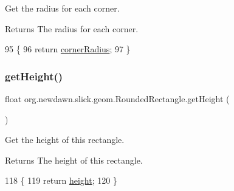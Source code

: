 Get the radius for each corner.

\begin{DoxyReturn}{Returns}
The radius for each corner. 
\end{DoxyReturn}

\begin{DoxyCode}
95                                    \{
96         \textcolor{keywordflow}{return} \mbox{\hyperlink{classorg_1_1newdawn_1_1slick_1_1geom_1_1_rounded_rectangle_a3326619644f3ba7e5493f8b191011aa1}{cornerRadius}};
97     \}
\end{DoxyCode}
\mbox{\label{classorg_1_1newdawn_1_1slick_1_1geom_1_1_rounded_rectangle_a95f4c34fc0fccbed758f172a326df4da}} 
\subsubsection{\texorpdfstring{get\+Height()}{getHeight()}}
{\footnotesize\ttfamily float org.\+newdawn.\+slick.\+geom.\+Rounded\+Rectangle.\+get\+Height (\begin{DoxyParamCaption}{ }\end{DoxyParamCaption})\hspace{0.3cm}{\ttfamily [inline]}}

Get the height of this rectangle.

\begin{DoxyReturn}{Returns}
The height of this rectangle. 
\end{DoxyReturn}

\begin{DoxyCode}
118                              \{
119         \textcolor{keywordflow}{return} \mbox{\hyperlink{classorg_1_1newdawn_1_1slick_1_1geom_1_1_rectangle_a3bd010fdce636fc11ed0e0ad4d4b4a0a}{height}};
120     \}
\end{DoxyCode}
\mbox{\label{classorg_1_1newdawn_1_1slick_1_1geom_1_1_rounded_rectangle_a2386753ef1889c21a6e664fa9f6bfcdd}} 
